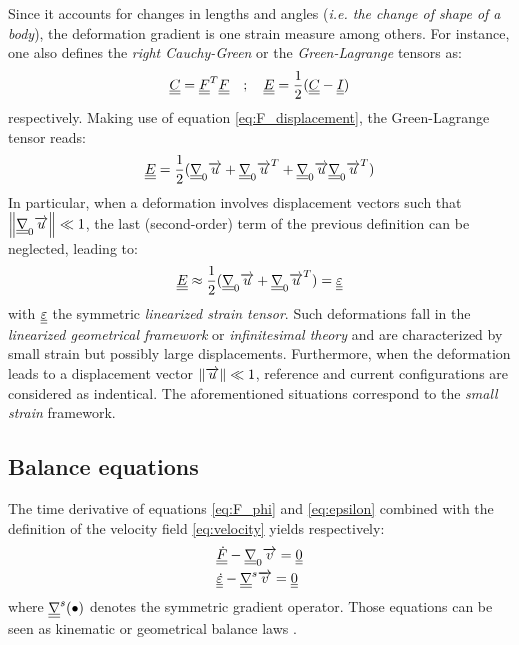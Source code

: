 Since it accounts for changes in lengths and angles (\textit{i.e. the change of shape of a body}), the deformation gradient is one strain measure among others. For instance, one also defines the \textit{right Cauchy-Green} or the \textit{Green-Lagrange} tensors as:
\begin{equation*}
  {\underline{\underline{C}}}={\underline{\underline{F}}}^T{\underline{\underline{F}}} \quad ; \quad {\underline{\underline{E}}}=\frac{1}{2}({\underline{\underline{C}}}-{\underline{\underline{I}}})
\end{equation*}
respectively. Making use of equation \eqref{eq:F_displacement}, the Green-Lagrange tensor reads:
\begin{equation*}
  {\underline{\underline{E}}}=\frac{1}{2}({\underline{\underline{\nabla}}}_0 {\overrightarrow{u}} + {\underline{\underline{\nabla}}}_0 {\overrightarrow{u}}^T + {\underline{\underline{\nabla}}}_0 {\overrightarrow{u}}{\underline{\underline{\nabla}}}_0 {\overrightarrow{u}}^T)
\end{equation*}
In particular, when a deformation involves displacement vectors such that $\left\Vert{\underline{\underline{\nabla}}}_0 {\overrightarrow{u}}\right\Vert \ll 1$, the last (second-order) term of the previous definition can be neglected, leading to:
\begin{equation}
  \label{eq:epsilon}
  {\underline{\underline{E}}} \approx \frac{1}{2}({\underline{\underline{\nabla}}}_0 {\overrightarrow{u}} + {\underline{\underline{\nabla}}}_0 {\overrightarrow{u}}^T) = {\underline{\underline{\varepsilon}}}
\end{equation}
with ${\underline{\underline{\varepsilon}}}$ the symmetric \textit{linearized strain tensor}. Such deformations fall in the \textit{linearized geometrical framework} or \textit{infinitesimal theory} and are characterized by small strain but possibly large displacements. Furthermore, when the deformation leads to a displacement vector $\left\Vert{\overrightarrow{u}}\right\Vert \ll 1$, reference and current configurations are considered as indentical. The aforementioned situations correspond to the \textit{small strain} framework.

\subsection{Balance equations}
The time derivative of equations \eqref{eq:F_phi} and \eqref{eq:epsilon} combined with the definition of the velocity field \eqref{eq:velocity} yields respectively:
\begin{align}
  & {\underline{\underline{\dot{F}}}} - {\underline{\underline{\nabla}}}_0{\overrightarrow{v}} = {\underline{\underline{0}}} \label{eq:HE_kinematic}\\
  & {\underline{\underline{\dot{\varepsilon}}}} - {\underline{\underline{\nabla}}}^s{\overrightarrow{v}} = {\underline{\underline{0}}} \label{eq:HPP_kinematic}
\end{align}
where ${\underline{\underline{\nabla}}}^s(\bullet)$ denotes the symmetric gradient operator. Those equations can be seen as kinematic or geometrical balance laws \cite{Plohr}.

